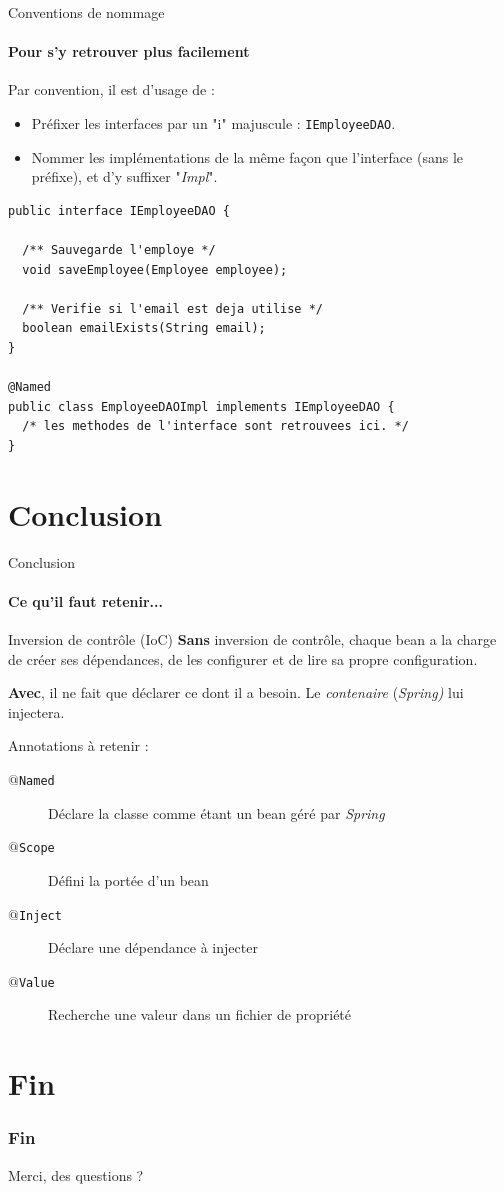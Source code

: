 \documentclass[compress]{beamer}%
\begin{document}
\begin{frame}[fragile]{Conventions de nommage}
	\framesubtitle{Pour s'y retrouver plus facilement}

	Par convention, il est d'usage de :
	\begin{itemize}
		\item Préfixer les interfaces par un "i" majuscule : \texttt{IEmployeeDAO}.
		\item Nommer les implémentations de la même façon que l'interface (sans le préfixe), et d'y suffixer "\emph{Impl}".
	\end{itemize}

	\pause

	\begin{lstlisting}
public interface IEmployeeDAO {

  /** Sauvegarde l'employe */
  void saveEmployee(Employee employee);

  /** Verifie si l'email est deja utilise */
  boolean emailExists(String email);
}

@Named
public class EmployeeDAOImpl implements IEmployeeDAO {
  /* les methodes de l'interface sont retrouvees ici. */
}
	\end{lstlisting}

\end{frame}


\section{Conclusion}

\begin{frame}{Conclusion}
	\framesubtitle{Ce qu'il faut retenir...}

	\begin{block}{Inversion de contrôle (IoC)}
		\textbf{Sans} inversion de contrôle, chaque bean a la charge de créer ses dépendances, de les configurer et de lire sa propre configuration.\par
		\textbf{Avec}, il ne fait que déclarer ce dont il a besoin. Le \emph{contenaire} (\emph{Spring)} lui injectera.
	\end{block}

	\pause
	Annotations à retenir :
	\begin{description}
		\item [\texttt{$@$Named}] Déclare la classe comme étant un bean géré par \emph{Spring}
		\item [\texttt{$@$Scope}] Défini la portée d'un bean
		\item [\texttt{$@$Inject}] Déclare une dépendance à injecter
		\item [\texttt{$@$Value}] Recherche une valeur dans un fichier de propriété
	\end{description}

\end{frame}

\section*{Fin}

\begin{frame}
	\frametitle{Fin}
	\begin{center}
		\huge
		Merci, des questions ?
	\end{center}
\end{frame}
\end{document}
